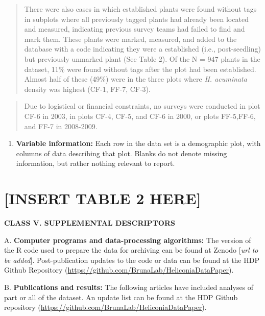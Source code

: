\documentclass[
  12pt,
  man, donotrepeattitle]{apa6}
\providecommand{\tightlist}{%
  \setlength{\itemsep}{0pt}\setlength{\parskip}{0pt}}
\begin{document}
\begin{quote}
There were also cases in which established plants were found without tags in subplots where all previously tagged plants had already been located and measured, indicating previous survey teams had failed to find and mark them. These plants were marked, measured, and added to the database with a code indicating they were a established (i.e., post-seedling) but previously unmarked plant (See Table 2). Of the N = 947 plants in the dataset, 11\% were found without tags after the plot had been established. Almost half of these (49\%) were in the three plots where \emph{H. acuminata} density was highest (CF-1, FF-7, CF-3).
\end{quote}

\begin{quote}
Due to logistical or financial constraints, no surveys were conducted in plot CF-6 in 2003, in plots CF-4, CF-5, and CF-6 in 2000, or plots FF-5,FF-6, and FF-7 in 2008-2009.
\end{quote}

\begin{enumerate}
\def\labelenumi{\arabic{enumi}.}
\setcounter{enumi}{7}
\tightlist
\item
  \textbf{Variable information:} Each row in the data set is a demographic plot, with columns of data describing that plot. Blanks do not denote missing information, but rather nothing relevant to report.
\end{enumerate}

\hypertarget{insert-table-2-here}{%
\section{{[}INSERT TABLE 2 HERE{]}}\label{insert-table-2-here}}

\noindent
\textbf{CLASS V. SUPPLEMENTAL DESCRIPTORS}

\noindent  
A. \textbf{Computer programs and data-processing algorithms:} The version of the R code used to prepare the data for archiving can be found at Zenodo {[}\emph{url to be added}{]}. Post-publication updates to the code or data can be found at the HDP Github Repository (\url{https://github.com/BrunaLab/HeliconiaDataPaper}).

\noindent  
B. \textbf{Publications and results:} The following articles have included analyses of part or all of the dataset. An update list can be found at the HDP Github repository (\url{https://github.com/BrunaLab/HeliconiaDataPaper}).
\end{document}
